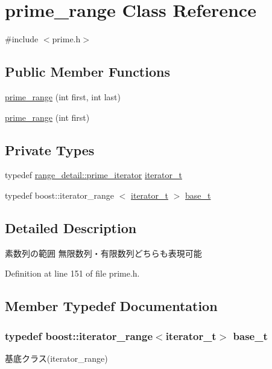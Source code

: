 \hypertarget{classyuh_1_1prime__range}{\section{prime\-\_\-range \-Class \-Reference}
\label{d5/d41/classyuh_1_1prime__range}
}


{\ttfamily \#include $<$prime.\-h$>$}

\subsection*{\-Public \-Member \-Functions}
\begin{DoxyCompactItemize}
\item 
\hyperlink{classyuh_1_1prime__range_aae62519f4eaff67463c1d2cb32e6e2fc}{prime\-\_\-range} (int first, int last)
\item 
\hyperlink{classyuh_1_1prime__range_ae1d6e243b47cf06c4c4b4cdc06ec2328}{prime\-\_\-range} (int first)
\end{DoxyCompactItemize}
\subsection*{\-Private \-Types}
\begin{DoxyCompactItemize}
\item 
typedef \*
\hyperlink{classyuh_1_1range__detail_1_1prime__iterator}{range\-\_\-detail\-::prime\-\_\-iterator} \hyperlink{classyuh_1_1prime__range_a4906d40c1f976001edeeb74a34231811}{iterator\-\_\-t}
\item 
typedef boost\-::iterator\-\_\-range\*
$<$ \hyperlink{classyuh_1_1prime__range_a4906d40c1f976001edeeb74a34231811}{iterator\-\_\-t} $>$ \hyperlink{classyuh_1_1prime__range_a9d51b0fc63206906184824c5b08403b2}{base\-\_\-t}
\end{DoxyCompactItemize}


\subsection{\-Detailed \-Description}
素数列の範囲 無限数列・有限数列どちらも表現可能 

\-Definition at line 151 of file prime.\-h.



\subsection{\-Member \-Typedef \-Documentation}
\hypertarget{classyuh_1_1prime__range_a9d51b0fc63206906184824c5b08403b2}{
\subsubsection[{base\-\_\-t}]{\setlength{\rightskip}{0pt plus 5cm}typedef boost\-::iterator\-\_\-range$<${\bf iterator\-\_\-t}$>$ {\bf base\-\_\-t}}}\label{d5/d41/classyuh_1_1prime__range_a9d51b0fc63206906184824c5b08403b2}
基底クラス(iterator\-\_\-range) 

